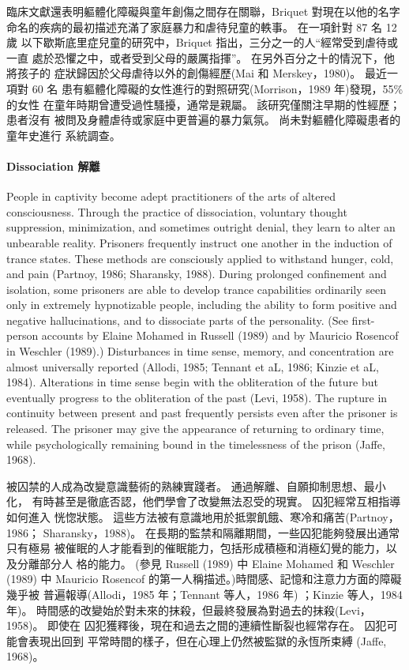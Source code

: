 \documentclass[12pt]{article}
\begin{document}
    臨床文獻還表明軀體化障礙與童年創傷之間存在關聯，Briquet 對現在以他的名字
    命名的疾病的最初描述充滿了家庭暴力和虐待兒童的軼事。 在一項針對 87 名 12 歲
    以下歇斯底里症兒童的研究中，Briquet 指出，三分之一的人“經常受到虐待或一直
    處於恐懼之中，或者受到父母的嚴厲指揮”。 在另外百分之十的情況下，他將孩子的
    症狀歸因於父母虐待以外的創傷經歷(Mai 和 Merskey，1980)。 最近一項對 60 名
    患有軀體化障礙的女性進行的對照研究(Morrison，1989 年)發現，55\% 的女性
    在童年時期曾遭受過性騷擾，通常是親屬。 該研究僅關注早期的性經歷； 患者沒有
    被問及身體虐待或家庭中更普遍的暴力氣氛。 尚未對軀體化障礙患者的童年史進行
    系統調查。

\paragraph{Dissociation 解離}
    People in captivity become adept practitioners of the arts of altered
    consciousness. Through the practice of dissociation, voluntary thought
    suppression, minimization, and sometimes outright denial, they learn to
    alter an unbearable reality. Prisoners frequently instruct one another in
    the induction of trance states. These methods are consciously applied to
    withstand hunger, cold, and pain (Partnoy, 1986; Sharansky, 1988). During
    prolonged confinement and isolation, some prisoners are able to develop
    trance capabilities ordinarily seen only in extremely hypnotizable people,
    including the ability to form positive and negative hallucinations, and to
    dissociate parts of the personality. (See first-person accounts by Elaine
    Mohamed in Russell (1989) and by Mauricio Rosencof in Weschler (1989).)
    Disturbances in time sense, memory, and concentration are almost
    universally reported (Allodi, 1985; Tennant et aL, 1986; Kinzie et aL,
    1984). Alterations in time sense begin with the obliteration of the future
    but eventually progress to the obliteration of the past (Levi, 1958). The
    rupture in continuity between present and past frequently persists even
    after the prisoner is released. The prisoner may give the appearance of
    returning to ordinary time, while psychologically remaining bound in the
    timelessness of the prison (Jaffe, 1968).

    被囚禁的人成為改變意識藝術的熟練實踐者。 通過解離、自願抑制思想、最小化，
    有時甚至是徹底否認，他們學會了改變無法忍受的現實。 囚犯經常互相指導如何進入
    恍惚狀態。 這些方法被有意識地用於抵禦飢餓、寒冷和痛苦(Partnoy，1986；
    Sharansky，1988)。 在長期的監禁和隔離期間，一些囚犯能夠發展出通常只有極易
    被催眠的人才能看到的催眠能力，包括形成積極和消極幻覺的能力，以及分離部分人
    格的能力。 (參見 Russell (1989) 中 Elaine Mohamed 和 Weschler (1989) 中
    Mauricio Rosencof 的第一人稱描述。)時間感、記憶和注意力方面的障礙幾乎被
    普遍報導(Allodi，1985 年；Tennant 等人，1986 年) ；Kinzie 等人，1984 年)。
    時間感的改變始於對未來的抹殺，但最終發展為對過去的抹殺(Levi，1958)。 即使在
    囚犯獲釋後，現在和過去之間的連續性斷裂也經常存在。 囚犯可能會表現出回到
    平常時間的樣子，但在心理上仍然被監獄的永恆所束縛 (Jaffe, 1968)。
\end{document}
